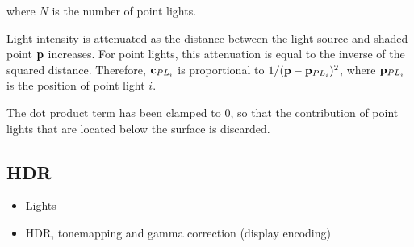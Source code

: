 where \begin{math}N\end{math} is the number of point lights.

Light intensity is attenuated as the distance between the light source and shaded point \begin{math}\mathbf{p}\end{math} increases. For point lights, this attenuation is equal to the inverse of the squared distance. Therefore, \begin{math}\mathbf{c}_{PL_i}\end{math} is proportional to \begin{math}1 / (\mathbf{p} - \mathbf{p}_{PL_i})^2\end{math}, where \begin{math}\mathbf{p}_{PL_i}\end{math} is the position of point light \begin{math}i\end{math}.

The dot product term has been clamped to 0, so that the contribution of point lights that are located below the surface is discarded.

\subsection{HDR} \label{HDR}

\begin{itemize}
	\item Lights
	\item HDR, tonemapping and gamma correction (display encoding)
\end{itemize}


